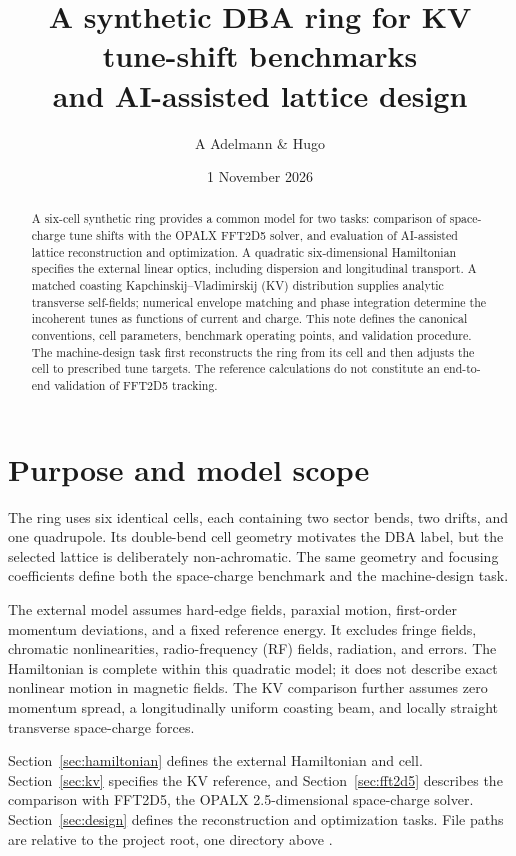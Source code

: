 \documentclass[11pt,a4paper]{article}
\title{A synthetic DBA ring for KV tune-shift benchmarks\\
and AI-assisted lattice design}
\author{A Adelmann \& Hugo}
\date{1 November 2026}
\numberwithin{equation}{section}
\begin{document}
\maketitle

\begin{abstract}
A six-cell synthetic ring provides a common model for two tasks: comparison
of space-charge tune shifts with the OPALX FFT2D5 solver, and evaluation of
AI-assisted lattice reconstruction and optimization. A quadratic
six-dimensional Hamiltonian specifies the external linear optics, including
dispersion and longitudinal transport. A matched coasting
Kapchinskij--Vladimirskij (KV) distribution supplies analytic transverse
self-fields; numerical envelope matching and phase integration determine
the incoherent tunes as functions of current and charge. This note defines
the canonical conventions, cell parameters, benchmark operating points,
and validation procedure. The machine-design task first reconstructs the
ring from its cell and then adjusts the cell to prescribed tune targets.
The reference calculations do not constitute an end-to-end validation of
FFT2D5 tracking.
\end{abstract}

\section{Purpose and model scope}
\label{sec:scope}

The ring uses six identical cells, each containing two sector bends, two
drifts, and one quadrupole. Its double-bend cell geometry motivates the
DBA label, but the selected lattice is deliberately non-achromatic. The
same geometry and focusing coefficients define both the space-charge
benchmark and the machine-design task.

The external model assumes hard-edge fields, paraxial motion,
first-order momentum deviations, and a fixed reference energy. It
excludes fringe fields, chromatic nonlinearities, radio-frequency (RF)
fields, radiation, and errors. The Hamiltonian is complete within this
quadratic model; it does not describe exact nonlinear motion in magnetic
fields. The KV comparison further assumes zero momentum spread, a
longitudinally uniform coasting beam, and locally straight transverse
space-charge forces.

Section~\ref{sec:hamiltonian} defines the external Hamiltonian and cell.
Section~\ref{sec:kv} specifies the KV reference, and
Section~\ref{sec:fft2d5} describes the comparison with FFT2D5, the OPALX
2.5-dimensional space-charge solver. Section~\ref{sec:design} defines the
reconstruction and optimization tasks. File paths are relative to the
project root, one directory above .
\end{document}
